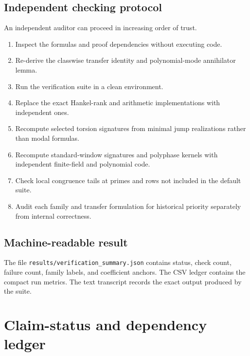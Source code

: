 \documentclass[11pt]{article}
\theoremstyle{definition}\newtheorem{definition}[theorem]{Definition}\newtheorem{example}[theorem]{Example}\newtheorem{construction}[theorem]{Construction}\newtheorem{algorithm}[theorem]{Algorithm}\newtheorem{conjecture}[theorem]{Conjecture}\newtheorem{problem}[theorem]{Problem}
\theoremstyle{remark}\newtheorem{remark}[theorem]{Remark}\newtheorem{boundary}[theorem]{Boundary}\newtheorem{certificate}[theorem]{Computational Certificate}\newtheorem{classical}[theorem]{Classical Input}\newtheorem{principle}[theorem]{Structural Principle}
\begin{document}
\subsection{Independent checking protocol}
An independent auditor can proceed in increasing order of trust.
\begin{enumerate}
\item Inspect the formulas and proof dependencies without executing code.
\item Re-derive the classwise transfer identity and polynomial-mode annihilator lemma.
\item Run the verification suite in a clean environment.
\item Replace the exact Hankel-rank and arithmetic implementations with independent ones.
\item Recompute selected torsion signatures from minimal jump realizations rather than modal formulas.
\item Recompute standard-window signatures and polyphase kernels with independent finite-field and polynomial code.
\item Check local congruence tails at primes and rows not included in the default suite.
\item Audit each family and transfer formulation for historical priority separately from internal correctness.
\end{enumerate}

\subsection{Machine-readable result}
The file \texttt{results/verification\_summary.json} contains status, check count, failure count, family labels, and coefficient anchors.  The CSV ledger contains the compact run metrics.  The text transcript records the exact output produced by the suite.


\section{Claim-status and dependency ledger}
\end{document}

